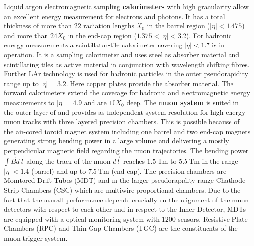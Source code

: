 Liquid argon electromagnetic sampling \textbf{calorimeters} with high granularity allow an excellent energy measurement for electrons and photons. It has a total thickness of more than $22$ radiation lengths $X_0$ in the barrel region ($|\eta|<1.475$) and more than $24X_0$ in the end-cap region ($1.375<|\eta|<3.2$). For hadronic energy measurements a scintillator-tile calorimeter covering $|\eta|<1.7$ is in operation. It is a sampling calorimeter and uses steel as absorber material and scintillating tiles as active material in conjunction with wavelength shifting fibres. Further LAr technology is used for hadronic particles in the outer pseudorapidity range up to $|\eta|=3.2$. Here copper plates provide the absorber material. The forward calorimeters extend the coverage for hadronic and electromagnetic energy measurements to $|\eta|=4.9$ and are $10X_0$ deep. \cite{ATLASJINST}\newline%
The \textbf{muon system} is suited in the outer layer of {\ATLAS} and provides as independent system resolution for high energy muon tracks with three layered precision chambers. This is possible because of the air-cored toroid magnet system including one barrel and two end-cap magnets generating strong bending power in a large volume and delivering  a mostly perpendicular magnetic field regarding the muon trajectories. The bending power $\int{\vec{B}d\vec{l}}$ along the track of the muon $d\vec{l}$ reaches $\SI{1.5}{\tesla\meter}$ to $\SI{5.5}{\tesla\meter}$ in the range $|\eta|<1.4$ (barrel) and up to $\SI{7.5}{\tesla\meter}$ (end-cap). The precision chambers are Monitored Drift Tubes (MDT) and in the larger pseudorapidity range Chathode Strip Chambers (CSC) which are multiwire proportional chambers. Due to the fact that the overall performance depends crucially on the alignment of the muon detectors with respect to each other and in respect to the Inner Detector, MDTs are equipped with a optical monitoring system with $1200$ sensors. Resistive Plate Chambers (RPC) and Thin Gap Chambers (TGC) are the constituents of the muon trigger system. \cite{ATLASJINST} \newline %
